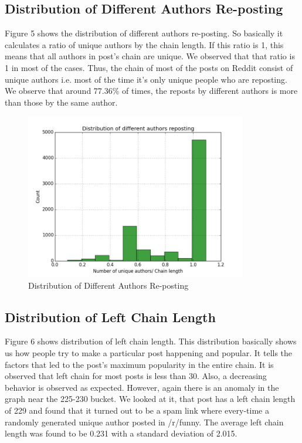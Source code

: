 \documentclass{article} %
\begin{document}
\subsection{Distribution of Different Authors Re-posting}

Figure 5 shows the distribution of different authors re-posting. So basically it calculates a ratio of unique authors by the chain length. If this ratio is 1, this means that all authors in post's chain are unique. We observed that that ratio is 1 in most of the cases. Thus, the chain of most of the posts on Reddit consist of unique authors i.e. most of the time it's only unique people who are reposting. 
We observe that around  77.36\% of times, the reposts by different authors is more than those by the same author.

\begin{figure}[h]
\begin{center}
\includegraphics[width=3.8in]{unique_authors.png}
\caption{Distribution of Different Authors Re-posting}
\end{center}
\end{figure}

\newpage

\subsection{Distribution of Left Chain Length}

Figure 6 shows distribution of left chain length. This distribution basically shows us how people try to make a particular post happening and popular. It tells the factors that led to the post's maximum popularity in the entire chain. It is observed that left chain for most posts is less than 30. Also, a decreasing behavior is observed as expected. However, again there is an anomaly in the graph near the 225-230 bucket. We looked at it, that post has a left chain length of 229 and found that it turned out to be a spam link where every-time a randomly generated unique author posted in /r/funny.
The average left chain length was found to be 0.231 with a standard deviation of 2.015.
\end{document}
